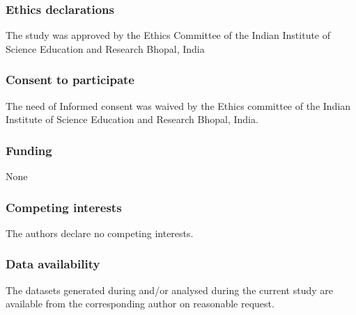 \documentclass[12pt]{article}
\begin{document}
\subsubsection*{Ethics declarations}
The study was approved by the Ethics Committee of the Indian Institute of Science Education and
Research Bhopal, India
\subsubsection*{Consent to participate}
The need of Informed consent was waived by the Ethics committee of the Indian Institute of Science
Education and Research Bhopal, India.
\subsubsection*{Funding}
None
\subsubsection*{Competing interests}
The authors declare no competing interests.
\subsubsection*{Data availability}
The datasets generated during and/or analysed during the current study are available from the corresponding
author on reasonable request.

% 
\printbibliography

% 
\end{document}
